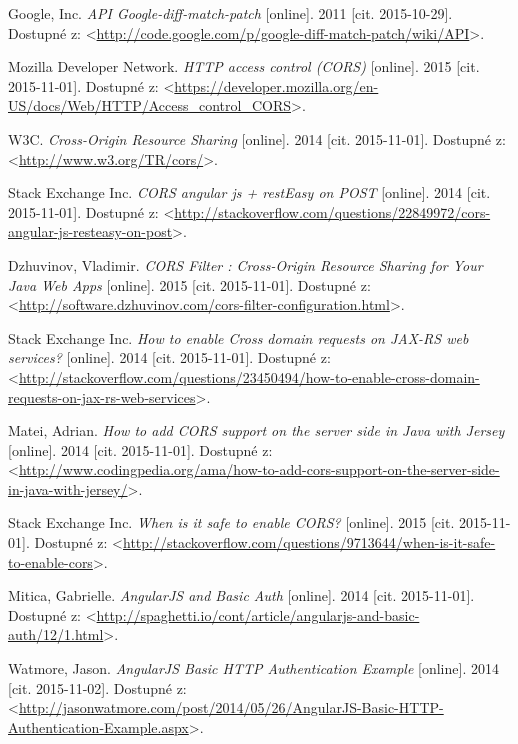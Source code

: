 \documentclass[12pt,oneside]{fithesis2}
\begin{document}
\begin{thebibliography}{59}
  		Google, Inc.
  		\emph{API Google-diff-match-patch}
  		[online].
  		2011
  		[cit. 2015-10-29].
  		Dostupné z: <\url{http://code.google.com/p/google-diff-match-patch/wiki/API}>.
  		
  		Mozilla Developer Network.
  		\emph{HTTP access control (CORS)}
  		[online].
  		2015
  		[cit. 2015-11-01].
  		Dostupné z: <\url{https://developer.mozilla.org/en-US/docs/Web/HTTP/Access_control_CORS}>.
  		
  		W3C.
  		\emph{Cross-Origin Resource Sharing}
  		[online].
  		2014
  		[cit. 2015-11-01].
  		Dostupné z: <\url{http://www.w3.org/TR/cors/}>.
  		
  		Stack Exchange Inc.
  		\emph{CORS angular js + restEasy on POST}
  		[online].
  		2014
  		[cit. 2015-11-01].
  		Dostupné z: <\url{http://stackoverflow.com/questions/22849972/cors-angular-js-resteasy-on-post}>.
		  	
  		Dzhuvinov, Vladimir.
  		\emph{CORS Filter : Cross-Origin Resource Sharing for Your Java Web Apps}
  		[online].
  		2015
  		[cit. 2015-11-01].
  		Dostupné z: <\url{http://software.dzhuvinov.com/cors-filter-configuration.html}>.	  		
 		
  		Stack Exchange Inc.
  		\emph{How to enable Cross domain requests on JAX-RS web services?}
  		[online].
  		2014
  		[cit. 2015-11-01].
  		Dostupné z: <\url{http://stackoverflow.com/questions/23450494/how-to-enable-cross-domain-requests-on-jax-rs-web-services}>.
 		
  		Matei, Adrian.
  		\emph{How to add CORS support on the server side in Java with Jersey}
  		[online].
  		2014
  		[cit. 2015-11-01].
  		Dostupné z: <\url{http://www.codingpedia.org/ama/how-to-add-cors-support-on-the-server-side-in-java-with-jersey/}>.
  		
  		Stack Exchange Inc.
  		\emph{When is it safe to enable CORS?}
  		[online].
  		2015
  		[cit. 2015-11-01].
  		Dostupné z: <\url{http://stackoverflow.com/questions/9713644/when-is-it-safe-to-enable-cors}>.
  		
  		Mitica, Gabrielle.
  		\emph{AngularJS and Basic Auth}
  		[online].
  		2014
  		[cit. 2015-11-01].
  		Dostupné z: <\url{http://spaghetti.io/cont/article/angularjs-and-basic-auth/12/1.html}>.
  		
  		Watmore, Jason.
  		\emph{AngularJS Basic HTTP Authentication Example}
  		[online].
  		2014
  		[cit. 2015-11-02].
  		Dostupné z: <\url{http://jasonwatmore.com/post/2014/05/26/AngularJS-Basic-HTTP-Authentication-Example.aspx}>.
  		

\end{thebibliography}
\end{document}
